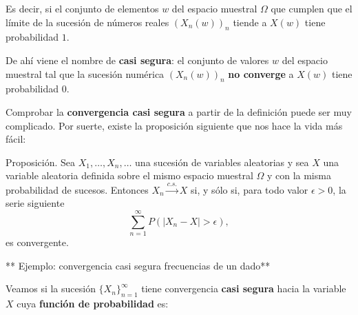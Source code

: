 \documentclass[
  letterpaper,
  DIV=11,
  numbers=noendperiod]{scrreprt}
\begin{document}
Es decir, si el conjunto de elementos \(w\) del espacio muestral
\(\Omega\) que cumplen que el límite de la sucesión de números reales
\((X_n(w))_n\) tiende a \(X(w)\) tiene probabilidad \(1\).

De ahí viene el nombre de \textbf{casi segura}: el conjunto de valores
\(w\) del espacio muestral tal que la sucesión numérica \((X_n(w))_n\)
\textbf{no converge} a \(X(w)\) tiene probabilidad 0.

Comprobar la \textbf{convergencia casi segura} a partir de la definición
puede ser muy complicado. Por suerte, existe la proposición siguiente
que nos hace la vida más fácil:

Proposición. Sea \(X_1,\ldots,X_n,\ldots\) una sucesión de variables
aleatorias y sea \(X\) una variable aleatoria definida sobre el mismo
espacio muestral \(\Omega\) y con la misma probabilidad de sucesos.
Entonces \(X_n\stackrel{c.s.}{\longrightarrow}X\) si, y sólo si, para
todo valor \(\epsilon >0\), la serie siguiente \[
\sum_{n=1}^\infty P(|X_n-X|>\epsilon),
\] es convergente.

** Ejemplo: convergencia casi segura frecuencias de un dado**

Veamos si la sucesión \(\{X_n\}_{n=1}^\infty\) tiene convergencia
\textbf{casi segura} hacia la variable \(X\) cuya \textbf{función de
probabilidad} es:
\end{document}
